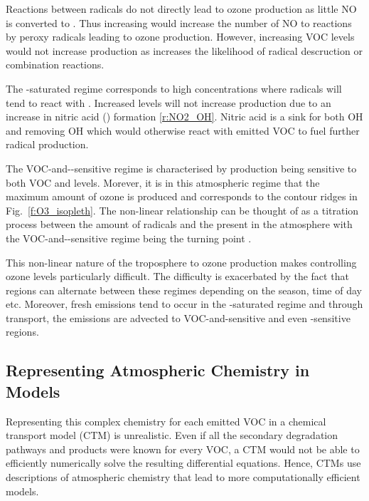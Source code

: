 Reactions between radicals do not directly lead to ozone production as little NO is converted to .
Thus increasing  would increase the number of NO to  reactions by peroxy radicals leading to ozone production.
However, increasing VOC levels would not increase  production as increases the likelihood of radical descruction or combination reactions.

The -saturated regime corresponds to high  concentrations where radicals will tend to react with . 
Increased  levels will not increase  production due to an increase in nitric acid () formation \eqref{r:NO2_OH}.
Nitric acid is a sink for both OH and  removing OH which would otherwise react with emitted VOC to fuel further radical production.

The VOC-and--sensitive regime is characterised by  production being sensitive to both VOC and  levels. 
Morever, it is in this atmospheric regime that the maximum amount of ozone is produced and corresponds to the contour ridges in Fig.~\ref{f:O3_isopleth}.
The non-linear relationship can be thought of as a titration process between the amount of radicals and the  present in the atmosphere with the VOC-and--sensitive regime being the turning point \citep{Kleinman:1991, Kleinman:1994}.

This non-linear nature of the troposphere to ozone production makes controlling ozone levels particularly difficult.
The difficulty is exacerbated by the fact that regions can alternate between these regimes depending on the season, time of day etc.
Moreover, fresh emissions tend to occur in the -saturated regime and through transport, the emissions are advected to VOC-and-sensitive and even -sensitive regions.

\subsection{Representing Atmospheric Chemistry in Models} \label{ss:chemistry_models}
Representing this complex chemistry for each emitted VOC in a chemical transport model (CTM) is unrealistic.
Even if all the secondary degradation pathways and products were known for every VOC, a CTM would not be able to efficiently numerically solve the resulting differential equations.
Hence, CTMs use descriptions of atmospheric chemistry that lead to more computationally efficient models.


